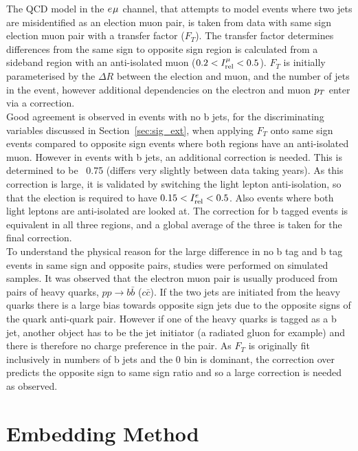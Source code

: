 The QCD model in the $e_{}\mu_{}$ channel, that attempts to model events where two jets are misidentified as an election muon pair, is taken from data with same sign election muon pair with a transfer factor ($F_{T}$).
The transfer factor determines differences from the same sign to opposite sign region is calculated from a sideband region with an anti-isolated muon ($0.2 < I_{\text{rel}}^{\mu} < 0.5$).
$F_{T}$ is initially parameterised by the $\Delta R$ between the election and muon, and the number of jets in the event, however additional dependencies on the electron and muon $p_{T}$ enter via a correction. \\
Good agreement is observed in events with no b jets, for the discriminating variables discussed in Section~\ref{sec:sig_ext}, when applying $F_{T}$ onto same sign events compared to opposite sign events where both regions have an anti-isolated muon. 
However in events with b jets, an additional correction is needed.
This is determined to be ~0.75 (differs very slightly between data taking years).
As this correction is large, it is validated by switching the light lepton anti-isolation, so that the election is required to have $0.15 < I_{\text{rel}}^{e} < 0.5$.
Also events where both light leptons are anti-isolated are looked at.
The correction for b tagged events is equivalent in all three regions, and a global average of the three is taken for the final correction. \\

To understand the physical reason for the large difference in no b tag and b tag events in same sign and opposite pairs, studies were performed on simulated samples.
It was observed that the electron muon pair is usually produced from pairs of heavy quarks, $pp\rightarrow b\bar{b}$ ($c\bar{c}$).
If the two jets are initiated from the heavy quarks there is a large bias towards opposite sign jets due to the opposite signs of the quark anti-quark pair.
However if one of the heavy quarks is tagged as a b jet, another object has to be the jet initiator (a radiated gluon for example) and there is therefore no charge preference in the pair.
As $F_{T}$ is originally fit inclusively in numbers of b jets and the 0 bin is dominant, the correction over predicts the opposite sign to same sign ratio and so a large correction is needed as observed.

\section{Embedding Method}
\label{sec:embedding}

